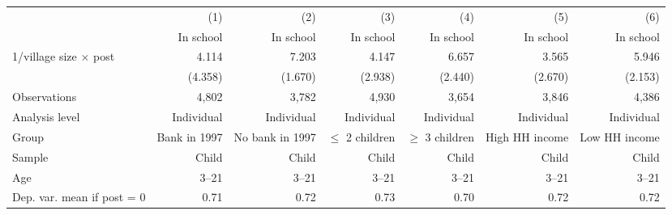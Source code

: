 \begin{center} \begin{threeparttable} \begin{tabular}{l*{6}{r}} \hline \hline 
                    &         (1)&         (2)&         (3)&         (4)&         (5)&         (6)\\
                    &   In school&   In school&   In school&   In school&   In school&   In school\\
\hline
1/village size $\times$ post&       4.114&       7.203&       4.147&       6.657&       3.565&       5.946\\
                    &     (4.358)&     (1.670)&     (2.938)&     (2.440)&     (2.670)&     (2.153)\\
\hline
Observations        &       4,802&       3,782&       4,930&       3,654&       3,846&       4,386\\
Analysis level      &  Individual&  Individual&  Individual&  Individual&  Individual&  Individual\\
Group               &Bank in 1997&No bank in 1997&$\leq$ 2 children&$\geq$ 3 children&High HH income&Low HH income\\
Sample              &       Child&       Child&       Child&       Child&       Child&       Child\\
Age                 &       3--21&       3--21&       3--21&       3--21&       3--21&       3--21\\
Dep. var. mean if post = 0&        0.71&        0.72&        0.73&        0.70&        0.72&        0.72\\
\hline \end{tabular} \end{threeparttable} \end{center}
